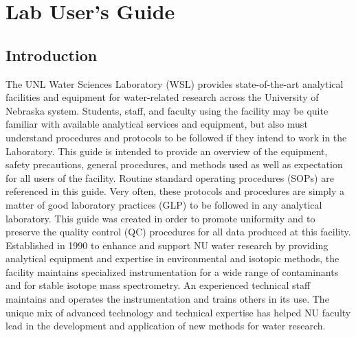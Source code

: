 \chapter{Lab User's Guide}

\section{Introduction}
The UNL Water Sciences Laboratory (WSL) provides state-of-the-art analytical facilities and equipment for water-related research across the University of Nebraska system. Students, staff, and faculty using the facility may be quite familiar with available analytical services and equipment, but also must understand procedures and protocols to be followed if they intend to work in the Laboratory. This guide is intended to provide an overview of the equipment, safety precautions, general procedures, and methods used as well as expectation for all users of the facility. Routine standard operating procedures (SOPs) are referenced in this guide. Very often, these protocols and procedures are simply a matter of good laboratory practices (GLP) to be followed in any analytical laboratory. This guide was created in order to promote uniformity and to preserve the quality control (QC) procedures for all data produced at this facility. Established in 1990 to enhance and support NU water research by providing analytical equipment and expertise in environmental and isotopic methods, the facility maintains specialized instrumentation for a wide range of contaminants and for stable isotope mass spectrometry. An experienced technical staff maintains and operates the instrumentation and trains others in its use. The unique mix of advanced technology and technical expertise has helped NU faculty lead in the development and application of new methods for water research. 

